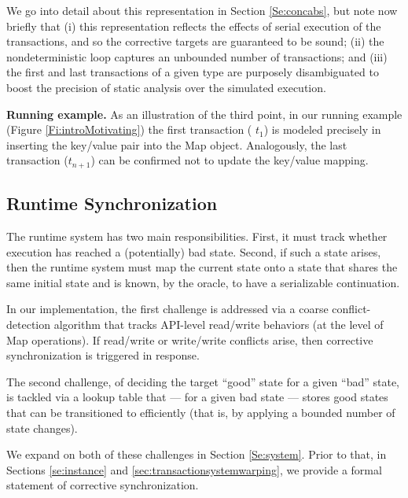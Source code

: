 We go into detail about this representation in Section \ref{Se:concabs}, but note now briefly that (i) this representation reflects the effects of serial execution of the transactions, and so the corrective targets are guaranteed to be sound; (ii) the nondeterministic loop captures an unbounded number of transactions; and (iii) the first and last transactions of a given type are purposely disambiguated to boost the precision of static analysis over the simulated execution.

\noindent \textbf{Running example.} As an illustration of the third point, in our running example (Figure \ref{Fi:introMotivating}) the first transaction ( $t_1$) is modeled precisely in inserting the key/value pair into the {\sf Map} object. Analogously, the last transaction ($t_{n+1}$) can be confirmed not to update the key/value mapping.

\subsection{Runtime Synchronization} 

The runtime system has two main responsibilities. First, it must track whether execution has reached a (potentially) bad state. Second, if such a state arises, then the runtime system must map the current state onto a state that shares the same initial state and is known, by the oracle, to have a serializable continuation. 

In our implementation, the first challenge is addressed via a coarse conflict-detection algorithm that tracks API-level read/write behaviors (at the level of {\sf Map} operations). If read/write or write/write conflicts arise, then corrective synchronization is triggered in response. 

The second challenge, of deciding the target ``good'' state for a given ``bad'' state, is tackled via a lookup table that --- for a given bad state --- stores good states that can be transitioned to efficiently (that is, by applying a bounded number of state changes).

We expand on both of these challenges in Section \ref{Se:system}. Prior to that, in Sections \ref{se:instance} and \ref{sec:transactionsystemwarping}, we provide a formal statement of corrective synchronization.